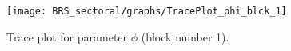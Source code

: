 \begin{figure}[H]
\centering
  \texttt{[image: BRS\_sectoral/graphs/TracePlot\_phi\_blck\_1]}\\
    \caption{Trace plot for parameter ${\phi}$ (block number 1).}
\end{figure}
